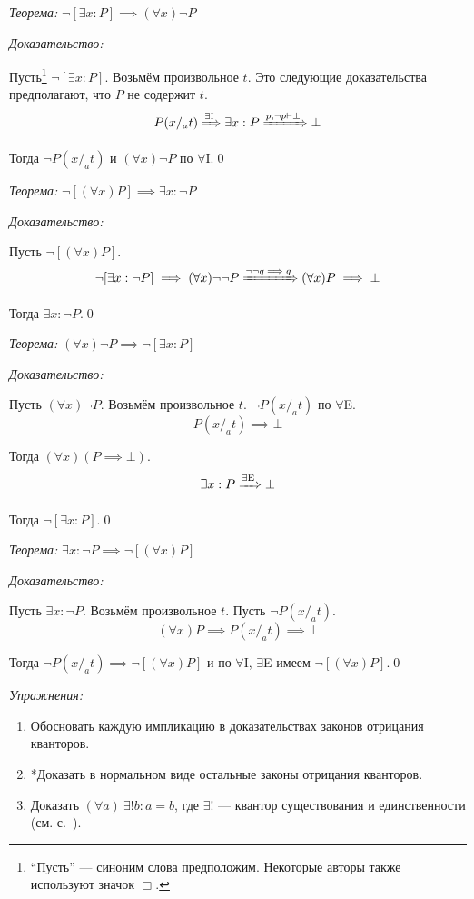 {\it Теорема:} $\lnot[\exists x:P]\implies (\forall x)\lnot P$

{\it Доказательство:}

Пусть\footnote{
	``Пусть'' --- синоним слова предположим. Некоторые авторы также
	используют значок $\sqsupset$.
} $\lnot[\exists x:P]$. Возьмём произвольное $t$. Это следующие доказательства
предполагают, что $P$ не содержит $t$.
\[
	P(x/_{a}t)\xRightarrow{\text{$\exists$I}} \exists x:P
	\xRightarrow{p,\lnot p\vdash\bot} \bot
\]

Тогда $\lnot P(x/_{a}t)$ и $(\forall x)\lnot P$
по $\forall$I.\qed

\vspace{1em}
{\it Теорема:} $\lnot[(\forall x)P]\implies \exists x:\lnot P$

{\it Доказательство:}

Пусть $\lnot[(\forall x)P]$.
\[
	\lnot[\exists x:\lnot P]\implies (\forall x)\lnot\lnot P
	\xRightarrow{\lnot\lnot q\implies q} (\forall x)P\implies\bot
\]

Тогда $\exists x:\lnot P$.\qed

\pagebreak

{\it Теорема:} $(\forall x)\lnot P\implies \lnot[\exists x:P]$

{\it Доказательство:}

Пусть $(\forall x)\lnot P$. Возьмём произвольное $t$. $\lnot P(x/_{a}t)$ по $\forall$E.
\[
	P(x/_{a}t)\implies \bot
\]

Тогда $(\forall x)(P\implies \bot)$.
\[
	\exists x:P\xRightarrow{\text{$\exists$E}} \bot
\]

Тогда $\lnot[\exists x:P]$.\qed

\vspace{1em}
{\it Теорема:} $\exists x:\lnot P\implies\lnot[(\forall x)P]$

{\it Доказательство:}

Пусть $\exists x:\lnot P$. Возьмём произвольное $t$. Пусть $\lnot P(x/_{a}t)$.
\[
	(\forall x)P\implies P(x/_{a}t)\implies \bot
\]

Тогда ${\lnot P(x/_{a}t)\implies \lnot[(\forall x)P]}$ и по $\forall$I, $\exists$E
имеем $\lnot[(\forall x)P]$.\qed

\vspace{1em}
{\it Упражнения:}
\begin{enumerate}
	\item{}Обосновать каждую импликацию в доказательствах законов отрицания кванторов.
	\item{}*Доказать в нормальном виде остальные законы отрицания кванторов.
	\item{}Доказать ${(\forall a)~\exists! b: a=b}$,
	где $\exists!$ --- квантор существования
	и единственности (см. с.~\pageref{page:exists_only}).
\end{enumerate}

\pagebreak
